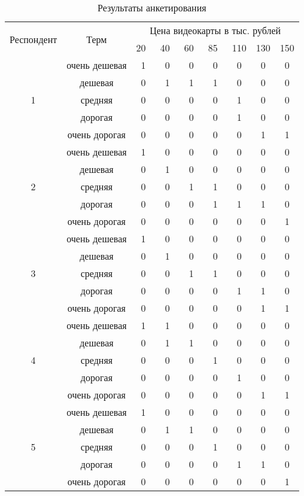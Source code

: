 \begin{table}[H]
	\centering
	\caption{Результаты анкетирования}
	\label{tbl:results}
	\begin{tabular}{|c|c|c|c|c|c|c|c|c|}
		\hline
	 	\multirow{2}{*}{Респондент} & \multirow{2}{*}{Терм} & \multicolumn{7}{c|}{Цена видеокарты в тыс. рублей} \\
	 	\cline{3-9} && 20~ & 40~ & 60~ & 85~ & 110 & 130 & 150 \\ \hline
  
	  	\multirow{5}{*}{1} & очень дешевая &1&0&0&0&0&0&0  \\
	  	\cline{2-9}
	  	& дешевая &0&1&1&1&0&0&0  \\
	  	\cline{2-9}
	  	& средняя &0&0&0&0&1&0&0  \\
	  	\cline{2-9}
	  	& дорогая &0&0&0&0&1&0&0  \\
	  	\cline{2-9}
	  	& очень дорогая &0&0&0&0&0&1&1  \\
	  	\hline
  
		\multirow{5}{*}{2} & очень дешевая &1&0&0&0&0&0&0  \\
		\cline{2-9}
		& дешевая &0&1&0&0&0&0&0  \\
		\cline{2-9}
		& средняя &0&0&1&1&0&0&0  \\
		\cline{2-9}
		& дорогая &0&0&0&1&1&1&0  \\
		\cline{2-9}
		& очень дорогая &0&0&0&0&0&0&1  \\
		\hline
		
		\multirow{5}{*}{3} & очень дешевая &1&0&0&0&0&0&0  \\
		\cline{2-9}
		& дешевая &0&1&0&0&0&0&0  \\
		\cline{2-9}
		& средняя &0&0&1&1&0&0&0  \\
		\cline{2-9}
		& дорогая &0&0&0&0&1&1&0  \\
		\cline{2-9}
		& очень дорогая &0&0&0&0&0&1&1  \\
		\hline
  
		\multirow{5}{*}{4} & очень дешевая &1&1&0&0&0&0&0  \\
		\cline{2-9}
		& дешевая &0&1&1&0&0&0&0  \\
		\cline{2-9}
		& средняя &0&0&0&1&0&0&0  \\
		\cline{2-9}
		& дорогая &0&0&0&0&1&0&0  \\
		\cline{2-9}
		& очень дорогая &0&0&0&0&0&1&1  \\
		\hline
	
		\multirow{5}{*}{5} & очень дешевая &1&0&0&0&0&0&0  \\
		\cline{2-9}
		& дешевая &0&1&1&0&0&0&0  \\
		\cline{2-9}
		& средняя &0&0&0&1&0&0&0  \\
		\cline{2-9}
		& дорогая &0&0&0&0&1&1&0  \\
		\cline{2-9}
		& очень дорогая &0&0&0&0&0&0&1  \\
		\hline
  
	\end{tabular}
\end{table}

